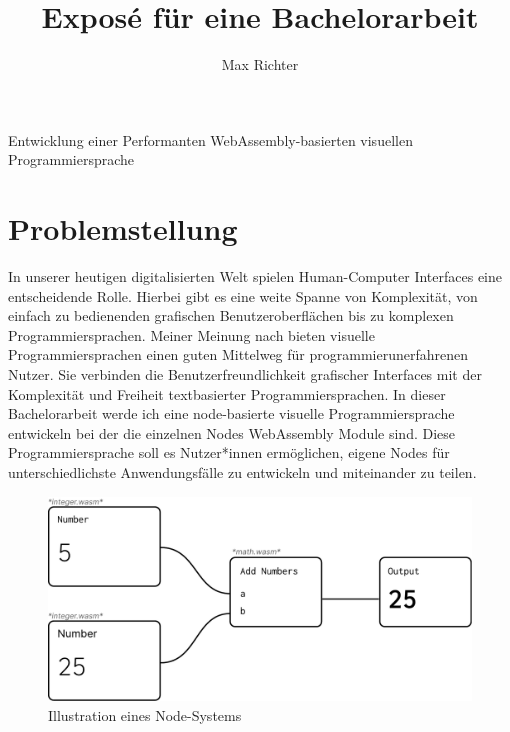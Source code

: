 \documentclass[ngerman]{article}
\title{Exposé für eine Bachelorarbeit}
\author{Max Richter}
\begin{document}
\pagestyle{fancy}
\fancyhead{} %
\fancyfoot{} %
\fancyfoot[LE,RO]{\thepage}

\raggedright

\maketitle
\pagebreak

{\LARGE Entwicklung einer Performanten WebAssembly-basierten visuellen Programmiersprache}
  
\section{Problemstellung}
In unserer heutigen digitalisierten  Welt spielen Human-Computer Interfaces eine entscheidende Rolle. Hierbei gibt es eine weite Spanne von Komplexität, von einfach zu bedienenden grafischen Benutzeroberflächen bis zu komplexen Programmiersprachen. Meiner Meinung nach bieten visuelle Programmiersprachen einen guten Mittelweg für programmierunerfahrenen Nutzer.
Sie verbinden die Benutzerfreundlichkeit grafischer Interfaces mit der Komplexität und Freiheit textbasierter Programmiersprachen. 
\linebreak
\linebreak
In dieser Bachelorarbeit werde ich eine node-basierte visuelle Programmiersprache entwickeln bei der die einzelnen Nodes WebAssembly Module sind. Diese Programmiersprache soll es Nutzer*innen ermöglichen, eigene Nodes für unterschiedlichste Anwendungsfälle zu entwickeln und miteinander zu teilen.
\begin{figure}[h]
\includegraphics[width=\textwidth]{ideas/nodes.pdf}
\caption{Illustration eines Node-Systems}
\end{figure}
\end{document}

